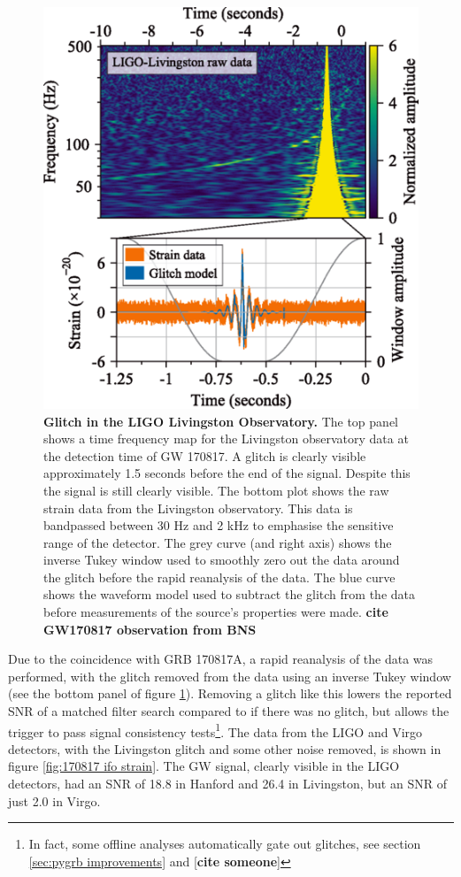 \documentclass[11pt]{cuthesis}
\begin{document}
\begin{figure} %
\begin{center}
\includegraphics[width=0.8\linewidth]{l1_glitch.png}
\end{center}
\caption{\textbf{Glitch in the LIGO Livingston Observatory.} The top panel shows a time frequency map for the Livingston observatory data at the detection time of GW 170817. A glitch is clearly visible approximately 1.5 seconds before the end of the signal. Despite this the signal is still clearly visible. The bottom plot shows the raw strain data from the Livingston observatory. This data is bandpassed between 30 Hz and 2 kHz to emphasise the sensitive range of the detector. The grey curve (and right axis) shows the inverse Tukey window used to smoothly zero out the data around the glitch before the rapid reanalysis of the data. The blue curve shows the waveform model used to subtract the glitch from the data before measurements of the source's properties were made. \textbf{cite GW170817 observation from BNS} }
\label{fig:l1 gltich}
\end{figure}

Due to the coincidence with GRB 170817A, a rapid reanalysis of the data was performed, with the glitch removed from the data using an inverse Tukey window (see the bottom panel of figure \ref{fig:l1 gltich}). Removing a glitch like this lowers the reported SNR of a matched filter search compared to if there was no glitch, but allows the trigger to pass signal consistency tests\footnote{In fact, some offline analyses automatically gate out glitches, see section \ref{sec:pygrb improvements} and [\textbf{cite someone}]}. The data from the LIGO and Virgo detectors, with the Livingston glitch and some other noise removed, is shown in figure \ref{fig:170817 ifo strain}. The GW signal, clearly visible in the LIGO detectors, had an SNR of 18.8 in Hanford and 26.4 in Livingston, but an SNR of just 2.0 in Virgo.
\end{document}
